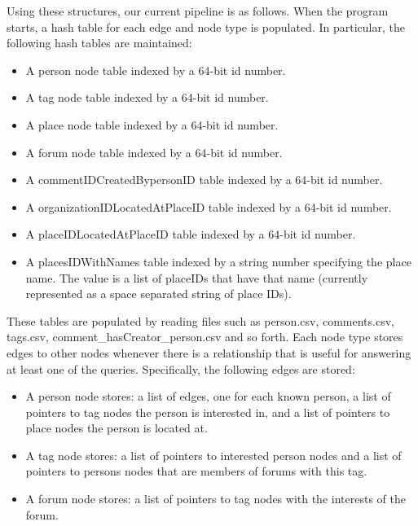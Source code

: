 \documentclass{article}
\begin{document}
Using these structures, our current pipeline is as follows. When the program starts, a
hash table for each edge and node type is populated. In particular, the following hash tables are maintained:

\begin{itemize}
\item A person node table indexed by a 64-bit id number.
\item A tag node table indexed by a 64-bit id number.
\item A place node table indexed by a 64-bit id number.
\item A forum node table indexed by a 64-bit id number. 
\item A commentIDCreatedBypersonID table indexed by a 64-bit id number.
\item A organizationIDLocatedAtPlaceID table indexed by a 64-bit id number.
\item A placeIDLocatedAtPlaceID table indexed by a 64-bit id number.
\item A placesIDWithNames table indexed by a string number specifying the place name. The value is a list of placeIDs that have that name (currently represented as a space separated string of place IDs).
\end{itemize}

These tables are populated by reading files such as person.csv, 
comments.csv, tags.csv, comment\_hasCreator\_person.csv and so forth. 
Each node type stores edges to other nodes whenever there is a relationship
that is useful for answering at least one of the queries. Specifically,
the following edges are stored:

\begin{itemize}
\item A person node stores: a list of edges, one for each known person, a list of pointers to tag nodes the person is interested in, and a list of pointers to place nodes the person is located at.
\item A tag node stores: a list of pointers to interested person nodes and a list of pointers to persons nodes that are members of forums with this tag. 
\item A forum node stores: a list of pointers to tag nodes with the interests of the forum. 
\end{itemize}

\end{document}
